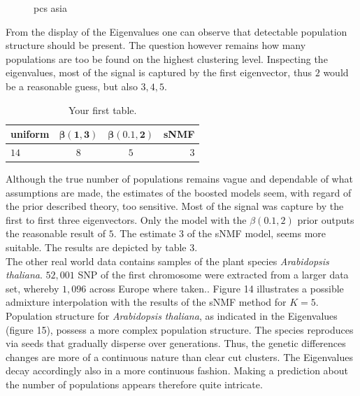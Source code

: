 \documentclass[a4paper, 11pt]{article}
\begin{document}
\begin{figure}
\begin{subfigure}
\caption{pcs asia}
\end{subfigure}
\end{figure}

From the display of the Eigenvalues one can observe that detectable population structure should be present. The question however remains how many populations are too be found on the highest clustering level. Inspecting the eigenvalues, most of the signal is captured by the first eigenvector, thus $2$ would be a reasonable guess, but also $3, 4, 5$.

\begin{table}[h!]
  \begin{center}
    \label{tab:table2}
    \begin{tabular}{l|c|c|r} %
      \textbf{uniform} & $\mathbf{\beta(1, 3)}$ & $\mathbf{\beta(0.1,2)}$  & \textbf{sNMF}\\
      \hline
      $14$ & $8$ & $5$  & $3$\\
    \end{tabular}
    \caption{Your first table.}
  \end{center}
\end{table}

Although the true number of populations remains vague and dependable of what assumptions are made, the estimates of the boosted models seem, with regard of the prior described theory, too sensitive. Most of the signal was capture by the first to first three eigenvectors. Only the model with the $\beta(0.1, 2)$ prior outputs the reasonable result of $5$. The estimate $3$ of the sNMF model, seems more suitable. The results are depicted by table 3.\\

The other real world data contains samples of the plant species \textit{Arabidopsis thaliana}. $52,001$ SNP of the first chromosome were extracted from a larger data set, whereby $1,096$ across Europe where taken.\parencite{franccois2016running}.
Figure 14 illustrates a possible admixture interpolation with the results of the sNMF method for $K = 5$. Population structure for \textit{Arabidopsis thaliana}, as indicated in the Eigenvalues (figure 15), possess a more complex population structure. The species reproduces via seeds that gradually disperse over generations. Thus, the genetic differences changes are more of a continuous nature than clear cut clusters. The Eigenvalues decay accordingly also in a more continuous fashion. Making a prediction about the number of populations appears therefore quite intricate.
\end{document}
